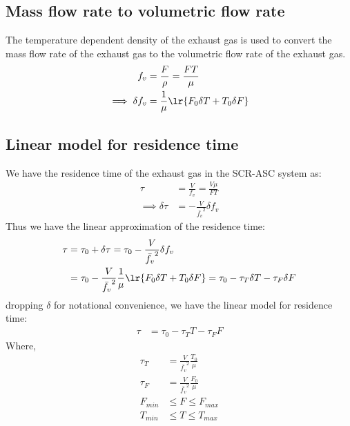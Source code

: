 \subsection{Mass flow rate to volumetric flow rate}
The temperature dependent density of the exhaust gas is used to convert the mass
flow rate of the exhaust gas to the volumetric flow rate of the exhaust gas.
\begin{align}
    f_v &= \frac{F}{\rho} = \frac{FT}{\mu}\\
    \implies \delta f_v &= \frac{1}{\mu} \lr{F_0 \delta T + T_0 \delta F}   \label{eqn::fv_approx}
\end{align}


\subsection{Linear model for residence time}
We have the residence time of the exhaust gas in the SCR-ASC system as:
\begin{align*}
    \tau &= \frac{V}{f_v} = \frac{V \mu}{FT} \\
    \implies
    \delta \tau &= - \frac{V}{\bar{f_v} ^2} \delta f_v
\end{align*}
Thus we have the linear approximation of the residence time:
\begin{align*}
    \tau &= \tau_0 + \delta \tau
          = \tau_0 - \frac{V}{\bar{f_v} ^2} \delta f_v\\
         &= \tau_0 - \frac{V}{\bar{f_v} ^2}  \frac{1}{\mu} \lr{F_0 \delta T + T_0 \delta F}
          = \tau_0 - \tau_T \delta T - \tau_F \delta F
\end{align*}
dropping $\delta$ for notational convenience, we have the linear model for residence time:
\begin{align}
    \tau &= \tau_0 - \tau_T T - \tau_F F        \label{eqn::res_time}
\end{align}
Where,
\begin{align*}
    \tau_T &= \frac{V}{\bar{f_v} ^2}  \frac{T_0}{\mu}\\
    \tau_F &= \frac{V}{\bar{f_v} ^2}  \frac{F_0}{\mu}\\
    F_{min} &\leq F \leq F_{max}\\
    T_{min} &\leq T \leq T_{max}
\end{align*}
